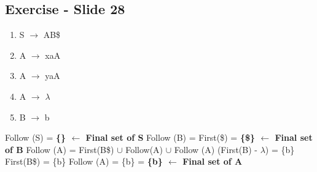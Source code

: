 \documentclass{report}
\begin{document}
\subsection{Exercise - Slide 28}
\vspace{-1.5em}
\begin{multicols}{2}
  \begin{enumerate}
    \setlength\itemsep{-.25em}
    \item S $\rightarrow$ AB\$
    \item A $\rightarrow$ xaA
    \item A $\rightarrow$ yaA
    \item A $\rightarrow$ $\lambda$
    \item B $\rightarrow$ b\newline\newline
  \end{enumerate}
  \setlength{\leftskip}{-12em}
Follow (S) = \textbf{ \{\} $\leftarrow$ Final set of S}\newline
Follow (B) = First(\$) = \textbf{ \{\$\}  $\leftarrow$ Final set of B}\newline
Follow (A) = First(B\$) $\cup$ Follow(A) $\cup$ Follow (A)\newline
\indent\hspace{.25cm}(First(B) - $\lambda$) = \{b\}\newline
\indent\hspace{.25cm}First(B\$) = \{b\}\newline
Follow (A) = \{b\} = \textbf{ \{b\} $\leftarrow$ Final set of A}\newline
\end{multicols}
\end{document}
